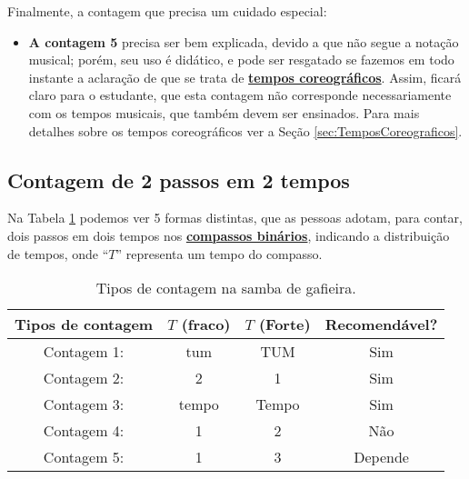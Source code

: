 Finalmente, a contagem que precisa um cuidado especial:
\begin{itemize}

\item \textbf{A contagem 5} precisa ser bem explicada, 
devido a que não segue a notação musical; 
porém, seu uso é didático, e pode ser resgatado se fazemos em todo instante a aclaração de 
que se trata de \hyperref[sec:TemposCoreograficos]{\textbf{tempos coreográficos}}.
Assim, ficará claro para o estudante, 
que esta contagem não corresponde necessariamente com os tempos musicais, 
que também devem ser ensinados.
Para mais detalhes sobre os tempos coreográficos ver a Seção \ref{sec:TemposCoreograficos}.

\end{itemize}


\subsection{Contagem de 2 passos em 2 tempos}

Na Tabela \ref{tab:ritmoconta2}  podemos ver 5 formas distintas, que  as pessoas adotam, 
para contar, dois passos em dois tempos nos \hyperref[subsec:compassobinario]{\textbf{compassos binários}}, 
indicando a distribuição de tempos, 
onde ``$T$'' representa um tempo do compasso.

\begin{table}[ht]
  \centering
  \begin{tabular}    {c|cc|c}
    \hline
    Tipos de contagem       & $T$ (fraco)  & $T$ (Forte)& Recomendável?\\
    \hline
    Contagem 1: & tum  & TUM  & Sim\\
    Contagem 2: & 2     & 1     & Sim\\
    Contagem 3: & tempo & Tempo & Sim\\ \hline
    Contagem 4: & 1     & 2     & Não\\ \hline
    Contagem 5: & 1     & 3     & Depende\\  \hline
    \hline
  \end{tabular}
  \caption{Tipos de contagem na samba de gafieira.}
\label{tab:ritmoconta2}
\end{table}



